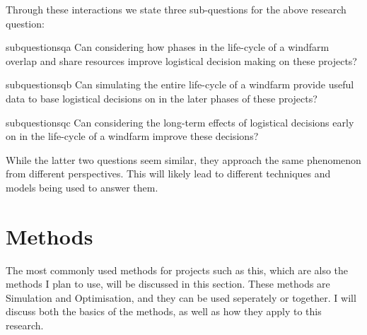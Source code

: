 \documentclass[a4paper,12pt]{article}
\begin{document}
Through these interactions we state three sub-questions for the above research question:

\begin{restatable}{subquestion}{sqa}
\label{sqa}
Can considering how phases in the life-cycle of a windfarm overlap and share resources improve logistical decision making on these projects?
\end{restatable}

\begin{restatable}{subquestion}{sqb}
\label{sqb}
Can simulating the entire life-cycle of a windfarm provide useful data to base logistical decisions on in the later phases of these projects?
\end{restatable}

\begin{restatable}{subquestion}{sqc}
\label{sqc}
Can considering the long-term effects of logistical decisions early on in the life-cycle of a windfarm improve these decisions? 
\end{restatable}

While the latter two questions seem similar, they approach the same phenomenon from different perspectives. This will likely lead to different techniques and models being used to answer them. 

\pagebreak

\section{Methods} \label{s:meth}
The most commonly used methods for projects such as this, which are also the methods I plan to use, will be discussed in this section. These methods are Simulation and Optimisation, and they can be used seperately or together. I will discuss both the basics of the methods, as well as how they apply to this research. 
\end{document}
